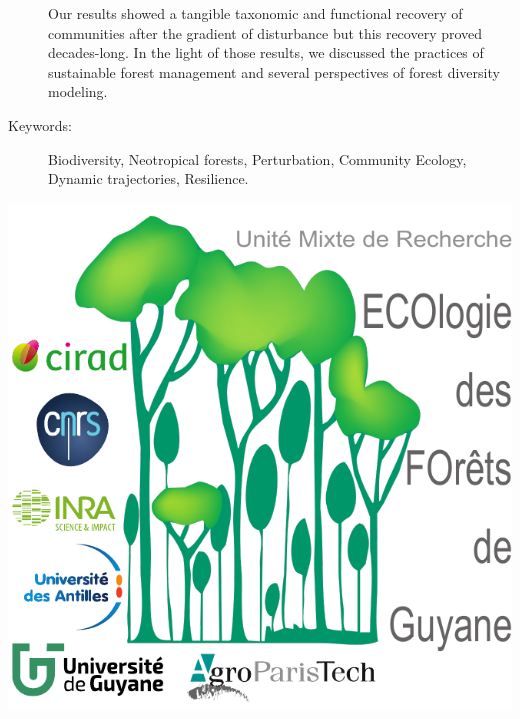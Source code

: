 \documentclass[
  11pt,
  french,
  A4paper,
  extrafontsizes,onecolumn,openright
  ]{memoir}
\begin{document}
\begin{normalsize}
\begin{description}
Our results showed a tangible taxonomic and functional recovery of
communities after the gradient of disturbance but this recovery proved
decades-long. In the light of those results, we discussed the practices
of sustainable forest management and several perspectives of forest
diversity modeling.

\item[Keywords:]
Biodiversity, Neotropical forests, Perturbation, Community Ecology, Dynamic trajectories, Resilience.

\end{description}

\end{normalsize}

\vspace*{\fill}
\centering\includegraphics[width=.3\textwidth]{images/Logo-Lab}
\end{document}
